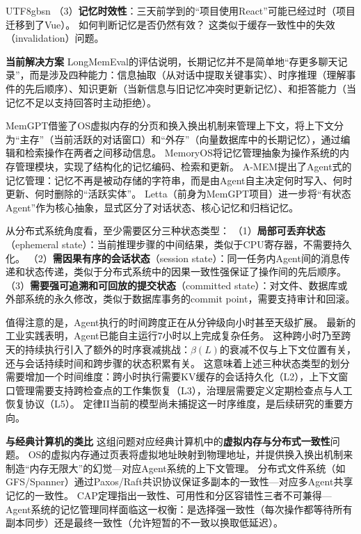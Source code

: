 \documentclass[11pt,a4paper]{article}
\begin{document}
\begin{CJK*}{UTF8}{gbsn}
（3）\textbf{记忆时效性}：三天前学到的``项目使用React''可能已经过时（项目迁移到了Vue）。
如何判断记忆是否仍然有效？
这类似于缓存一致性中的失效（invalidation）问题。

\textbf{当前解决方案}
LongMemEval\cite{longmemeval2024}的评估说明，长期记忆并不是简单地``存更多聊天记录''，而是涉及四种能力：信息抽取（从对话中提取关键事实）、时序推理（理解事件的先后顺序）、知识更新（当新信息与旧记忆冲突时更新记忆）、和拒答能力（当记忆不足以支持回答时主动拒绝）。

MemGPT\cite{memgpt2023}借鉴了OS虚拟内存的分页和换入换出机制来管理上下文，将上下文分为``主存''（当前活跃的对话窗口）和``外存''（向量数据库中的长期记忆），通过编辑和检索操作在两者之间移动信息。
MemoryOS\cite{memoryos2025}将记忆管理抽象为操作系统的内存管理模块，实现了结构化的记忆编码、检索和更新。
A-MEM\cite{amem2025}提出了Agent式的记忆管理：记忆不再是被动存储的字符串，而是由Agent自主决定何时写入、何时更新、何时删除的``活跃实体''。
Letta\cite{letta_stateful_2026}（前身为MemGPT项目）进一步将``有状态Agent''作为核心抽象，显式区分了对话状态、核心记忆和归档记忆。

从分布式系统角度看，至少需要区分三种状态类型\cite{raft2014,spanner2012,cap2002}：
（1）\textbf{局部可丢弃状态}（ephemeral state）：当前推理步骤的中间结果，类似于CPU寄存器，不需要持久化。
（2）\textbf{需因果有序的会话状态}（session state）：同一任务内Agent间的消息传递和状态传递，类似于分布式系统中的因果一致性强保证了操作间的先后顺序\cite{raft2014}。
（3）\textbf{需要强可追溯和可回放的提交状态}（committed state）：对文件、数据库或外部系统的永久修改，类似于数据库事务的commit point，需要支持审计和回滚\cite{spanner2012}。

值得注意的是，Agent执行的时间跨度正在从分钟级向小时甚至天级扩展。
最新的工业实践表明，Agent已能自主运行7小时以上完成复杂任务\cite{anthropic2026agenticreport}。
这种跨小时乃至跨天的持续执行引入了额外的时序衰减挑战：$\beta(L)$的衰减不仅与上下文位置有关，还与会话持续时间和跨步骤的状态积累有关。
这意味着上述三种状态类型的划分需要增加一个时间维度：跨小时执行需要KV缓存的会话持久化（L2），上下文窗口管理需要支持跨检查点的工作集恢复（L3），治理层需要定义定期检查点与人工恢复协议（L5）。
定律II当前的模型尚未捕捉这一时序维度，是后续研究的重要方向。

\textbf{与经典计算机的类比}
这组问题对应经典计算机中的\textbf{虚拟内存与分布式一致性}问题。
OS的虚拟内存通过页表将虚拟地址映射到物理地址，并提供换入换出机制来制造``内存无限大''的幻觉---对应Agent系统的上下文管理。
分布式文件系统（如GFS/Spanner\cite{spanner2012}）通过Paxos/Raft\cite{raft2014}共识协议保证多副本的一致性---对应多Agent共享记忆的一致性。
CAP定理\cite{cap2002}指出一致性、可用性和分区容错性三者不可兼得---Agent系统的记忆管理同样面临这一权衡：是选择强一致性（每次操作都等待所有副本同步）还是最终一致性（允许短暂的不一致以换取低延迟）。


\end{CJK*}
\end{document}
